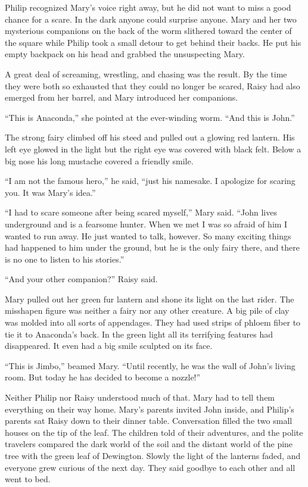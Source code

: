 \documentclass[10pt]{memoir}
\begin{document}
Philip recognized Mary's voice right away, but he did not want to miss a good
chance for a scare. In the dark anyone could surprise anyone. Mary and her two
mysterious companions on the back of the worm slithered toward the center of
the square while Philip took a small detour to get behind their backs. He put
his empty backpack on his head and grabbed the unsuspecting Mary.

A great deal of screaming, wrestling, and chasing was the result. By the time
they were both so exhausted that they could no longer be scared, Raisy had also
emerged from her barrel, and Mary introduced her companions.

``This is Anaconda,'' she pointed at the ever-winding worm. ``And this is
John.''

The strong fairy climbed off his steed and pulled out a glowing red lantern.
His left eye glowed in the light but the right eye was covered with black felt.
Below a big nose his long mustache covered a friendly smile.

``I am not the famous hero,'' he said, ``just his namesake. I apologize for
scaring you. It was Mary's idea.''

``I had to scare someone after being scared myself,'' Mary said. ``John lives
underground and is a fearsome hunter. When we met I was so afraid of him I
wanted to run away. He just wanted to talk, however. So many exciting things
had happened to him under the ground, but he is the only fairy there, and there
is no one to listen to his stories.''

``And your other companion?'' Raisy said.

Mary pulled out her green fur lantern and shone its light on the last rider.
The misshapen figure was neither a fairy nor any other creature. A big pile of
clay was molded into all sorts of appendages. They had used strips of phloem
fiber to tie it to Anaconda's back. In the green light all its terrifying
features had disappeared. It even had a big smile sculpted on its face.

``This is Jimbo,'' beamed Mary. ``Until recently, he was the wall of John's
living room. But today he has decided to become a nozzle!''

Neither Philip nor Raisy understood much of that. Mary had to tell them
everything on their way home. Mary's parents invited John inside, and Philip's
parents sat Raisy down to their dinner table. Conversation filled the two small
houses on the tip of the leaf. The children told of their adventures, and the
polite travelers compared the dark world of the soil and the distant world of
the pine tree with the green leaf of Dewington. Slowly the light of the
lanterns faded, and everyone grew curious of the next day. They said goodbye to
each other and all went to bed.
\end{document}
